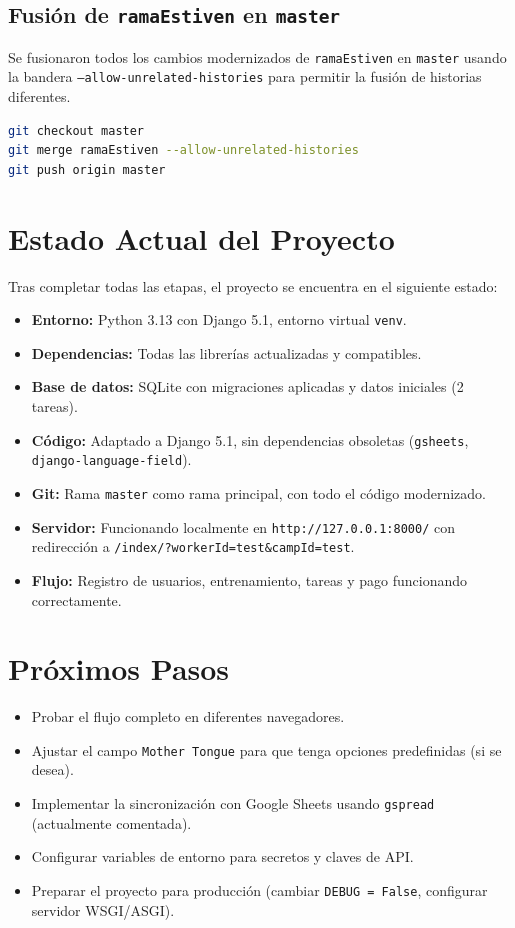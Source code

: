 \documentclass[12pt, spanish]{article}
\begin{document}
\subsection{Fusión de \texttt{ramaEstiven} en \texttt{master}}
Se fusionaron todos los cambios modernizados de \texttt{ramaEstiven} en \texttt{master} usando la bandera \texttt{--allow-unrelated-histories} para permitir la fusión de historias diferentes.

\begin{lstlisting}[language=bash, caption={Fusión de ramaEstiven en master}]
git checkout master
git merge ramaEstiven --allow-unrelated-histories
git push origin master
\end{lstlisting}

\section{Estado Actual del Proyecto}
Tras completar todas las etapas, el proyecto se encuentra en el siguiente estado:

\begin{itemize}[label=--]
    \item \textbf{Entorno:} Python 3.13 con Django 5.1, entorno virtual \texttt{venv}.
    \item \textbf{Dependencias:} Todas las librerías actualizadas y compatibles.
    \item \textbf{Base de datos:} SQLite con migraciones aplicadas y datos iniciales (2 tareas).
    \item \textbf{Código:} Adaptado a Django 5.1, sin dependencias obsoletas (\texttt{gsheets}, \texttt{django-language-field}).
    \item \textbf{Git:} Rama \texttt{master} como rama principal, con todo el código modernizado.
    \item \textbf{Servidor:} Funcionando localmente en \texttt{http://127.0.0.1:8000/} con redirección a \texttt{/index/?workerId=test\&campId=test}.
    \item \textbf{Flujo:} Registro de usuarios, entrenamiento, tareas y pago funcionando correctamente.
\end{itemize}

\section{Próximos Pasos}
\begin{itemize}[label=--]
    \item Probar el flujo completo en diferentes navegadores.
    \item Ajustar el campo \texttt{Mother Tongue} para que tenga opciones predefinidas (si se desea).
    \item Implementar la sincronización con Google Sheets usando \texttt{gspread} (actualmente comentada).
    \item Configurar variables de entorno para secretos y claves de API.
    \item Preparar el proyecto para producción (cambiar \texttt{DEBUG = False}, configurar servidor WSGI/ASGI).
\end{itemize}
\end{document}
